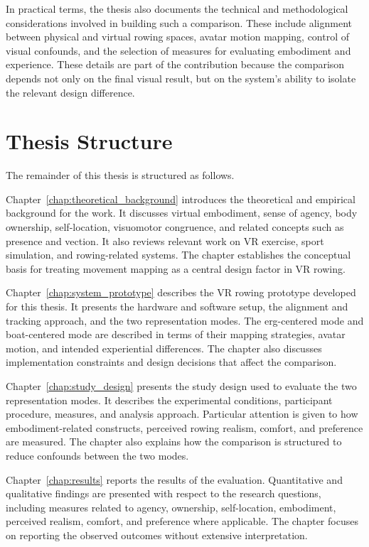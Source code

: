 In practical terms, the thesis also documents the technical and methodological considerations involved in building such a comparison. These include alignment between physical and virtual rowing spaces, avatar motion mapping, control of visual confounds, and the selection of measures for evaluating embodiment and experience. These details are part of the contribution because the comparison depends not only on the final visual result, but on the system's ability to isolate the relevant design difference.

\section{Thesis Structure}
\label{sec:introduction_thesis_structure}

The remainder of this thesis is structured as follows.

Chapter~\ref{chap:theoretical_background} introduces the theoretical and empirical background for the work. It discusses virtual embodiment, sense of agency, body ownership, self-location, visuomotor congruence, and related concepts such as presence and vection. It also reviews relevant work on VR exercise, sport simulation, and rowing-related systems. The chapter establishes the conceptual basis for treating movement mapping as a central design factor in VR rowing.

Chapter~\ref{chap:system_prototype} describes the VR rowing prototype developed for this thesis. It presents the hardware and software setup, the alignment and tracking approach, and the two representation modes. The erg-centered mode and boat-centered mode are described in terms of their mapping strategies, avatar motion, and intended experiential differences. The chapter also discusses implementation constraints and design decisions that affect the comparison.

Chapter~\ref{chap:study_design} presents the study design used to evaluate the two representation modes. It describes the experimental conditions, participant procedure, measures, and analysis approach. Particular attention is given to how embodiment-related constructs, perceived rowing realism, comfort, and preference are measured. The chapter also explains how the comparison is structured to reduce confounds between the two modes.

Chapter~\ref{chap:results} reports the results of the evaluation. Quantitative and qualitative findings are presented with respect to the research questions, including measures related to agency, ownership, self-location, embodiment, perceived realism, comfort, and preference where applicable. The chapter focuses on reporting the observed outcomes without extensive interpretation.

